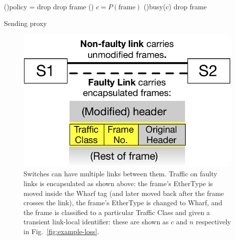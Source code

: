 \documentclass[sigconf]{acmart}
\newcommand{\OurSys}{Wharf\xspace}
\begin{document}
\begin{algorithm}
\SetAlgoLined
{}
\uIf(){policy = drop}{
drop frame\;
}\Else(){
  $c = P(\mathrm{frame})$ 
  \uIf(){busy(c)}{
drop frame\;
}
}
\caption{\label{alg:sending}Sending proxy}
\end{algorithm}


\begin{figure}
  \centering
  \includegraphics[width=0.3\paperwidth]{header_format.pdf}
  \caption{\label{fig:format}Switches can have multiple links between them.
  Traffic on faulty links is encapsulated as shown above: the frame's EtherType
  is moved inside the \OurSys tag (and later moved back after the frame crosses
  the link), the frame's EtherType is changed to \OurSys, and the frame is
  classified to a particular Traffic Class and given a transient link-local
  identifier: these are shown as $c$ and $n$ respectively in
  Fig.~\ref{fig:example-loss}.}
\end{figure}
\end{document}
